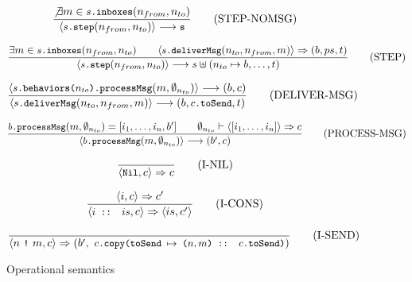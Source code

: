 \documentclass[a4paper,twoside]{article}
\newcommand{\stt}[1]{\texttt{\small{#1}}}
\begin{document}
\begin{figure}[!h]
\begin{framed}
 
\begin{equation}
\dfrac{
  \not\exists m \in \stt{$s$.inboxes}(n_{from}, n_{to})
}{
  \langle \stt{$s$.step}(n_{from}, n_{to}) \rangle \longrightarrow \stt{s}
}
\tag{STEP-NOMSG}
\end{equation}

\vspace{10pt}
\begin{equation}
\dfrac{
  \exists m \in \stt{$s$.inboxes}(n_{from}, n_{to}) \qquad
  \langle \stt{$s$.deliverMsg}(n_{to}, n_{from}, m) \rangle \Rightarrow (b, ps, t)
}{
  \langle \stt{$s$.step}(n_{from}, n_{to}) \rangle \longrightarrow s \uplus (n_{to} \mapsto b, \ldots, t)
}
\tag{STEP}
\end{equation}

\vspace{10pt}
\begin{equation}
\dfrac{
  \langle \stt{$s$.behaviors($n_{to}$).processMsg}(m, \emptyset_{n_{to}}) \rangle \longrightarrow (b, c) 
}{
   \langle \stt{$s$.deliverMsg}(n_{to}, n_{from}, m) \rangle \longrightarrow (b, \stt{$c$.toSend}, t)
}
\tag{DELIVER-MSG}
\end{equation}

\vspace{10pt}
\begin{equation}
\dfrac{
  \stt{$b$.processMsg}(m, \emptyset_{n_{to}}) = [i_1, \ldots, i_n, b'] \qquad
  \emptyset_{n_{to}} \vdash \langle [i_1, \ldots, i_n] \rangle \Rightarrow c
}{
   \langle \stt{$b$.processMsg}(m, \emptyset_{n_{to}}) \rangle \longrightarrow (b', c)
}
\tag{PROCESS-MSG}
\end{equation}

\vspace{10pt}
\begin{equation}
\dfrac{\empty}{
   \langle \stt{Nil}, c \rangle \Rightarrow c
}
\tag{I-NIL}
\end{equation}

\vspace{10pt}
\begin{equation}
\dfrac{
  \langle i, c \rangle \Rightarrow c'
}{
  \langle \stt{$i$ :: $is$}, c \rangle \Rightarrow \langle is, c' \rangle
}
\tag{I-CONS}
\end{equation}

\vspace{10pt}
\begin{equation}
\dfrac{\empty}{
   \langle n\ \stt{!}\ m, c \rangle \Rightarrow (b',\ \stt{$c$.copy(toSend $\mapsto$ ($n, m$) :: $c$.toSend)})
}
\tag{I-SEND}
\end{equation}

\end{framed}
\vspace{-10pt}
\caption{Operational semantics\label{fig:opsem}}
\end{figure}
\end{document}
